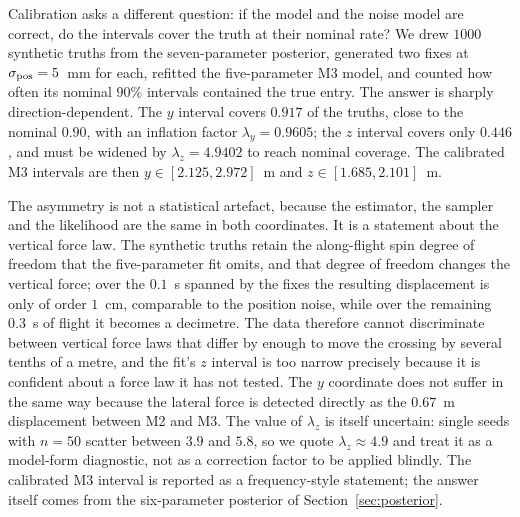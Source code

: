 Calibration asks a different question: if the model and the noise model are
correct, do the intervals cover the truth at their nominal rate? We drew $1000$
synthetic truths from the seven-parameter posterior, generated two fixes at
$\sigma_{\rm pos}=5$~mm for each, refitted the five-parameter M3 model, and
counted how often its nominal $90\%$ intervals contained the true entry. The
answer is sharply direction-dependent. The $y$ interval covers $0.917$ of the
truths, close to the nominal $0.90$, with an inflation factor
$\lambda_y=0.9605$; the $z$ interval covers only $0.446$, and must be widened by
$\lambda_z=4.9402$ to reach nominal coverage. The calibrated M3 intervals are then
$y\in[2.125,2.972]$~m and $z\in[1.685,2.101]$~m.

The asymmetry is not a statistical artefact, because the estimator, the sampler
and the likelihood are the same in both coordinates. It is a statement about the
vertical force law. The synthetic truths retain the along-flight spin degree of
freedom that the five-parameter fit omits, and that degree of freedom changes the
vertical force; over the $0.1$~s spanned by the fixes the resulting displacement
is only of order $1$~cm, comparable to the position noise, while over the
remaining $0.3$~s of flight it becomes a decimetre. The data therefore cannot
discriminate between vertical force laws that differ by enough to move the
crossing by several tenths of a metre, and the fit's $z$ interval is too narrow
precisely because it is confident about a force law it has not tested. The $y$
coordinate does not suffer in the same way because the lateral force is detected
directly as the $0.67$~m displacement between M2 and M3. The value of
$\lambda_z$ is itself uncertain: single seeds with $n=50$ scatter between $3.9$
and $5.8$, so we quote $\lambda_z\approx4.9$ and treat it as a model-form
diagnostic, not as a correction factor to be applied blindly. The calibrated M3
interval is reported as a frequency-style statement; the answer itself comes from
the six-parameter posterior of Section~\ref{sec:posterior}.

